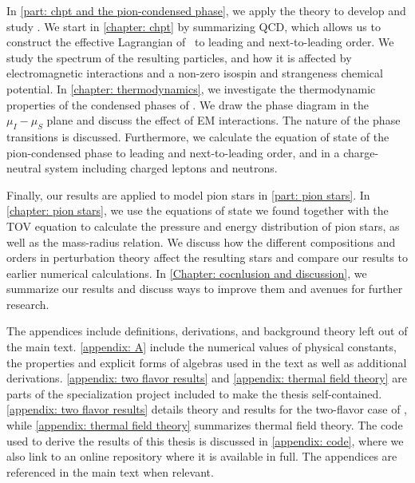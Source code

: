 In \autoref{part: chpt and the pion-condensed phase}, we apply the theory to develop and study \chpt.
We start in \autoref{chapter: chpt} by summarizing QCD, which allows us to construct the effective Lagrangian of \chpt\, to leading and next-to-leading order.
We study the spectrum of the resulting particles, and how it is affected by electromagnetic interactions and a non-zero isospin and strangeness chemical potential.
In \autoref{chapter: thermodynamics}, we investigate the thermodynamic properties of the condensed phases of \chpt.
We draw the phase diagram in the $\mu_I-\mu_S$ plane and discuss the effect of EM interactions.
The nature of the phase transitions is discussed.
Furthermore, we calculate the equation of state of the pion-condensed phase to leading and next-to-leading order, and in a charge-neutral system including charged leptons and neutrons.

Finally, our results are applied to model pion stars in \autoref{part: pion stars}.
In \autoref{chapter: pion stars}, we use the equations of state we found together with the TOV equation to calculate the pressure and energy distribution of pion stars, as well as the mass-radius relation.
We discuss how the different compositions and orders in perturbation theory affect the resulting stars and compare our results to earlier numerical calculations.
In \autoref{Chapter: cocnlusion and discussion}, we summarize our results and discuss ways to improve them and avenues for further research.

The appendices include definitions, derivations, and background theory left out of the main text.
\autoref{appendix: A} include the numerical values of physical constants, the properties and explicit forms of algebras used in the text as well as additional derivations.
\autoref{appendix: two flavor results} and \autoref{appendix: thermal field theory} are parts of the specialization project included to make the thesis self-contained.
\autoref{appendix: two flavor results} details theory and results for the two-flavor case of \chpt, while \autoref{appendix: thermal field theory} summarizes thermal field theory.
The code used to derive the results of this thesis is discussed in \autoref{appendix: code}, where we also link to an online repository where it is available in full.
The appendices are referenced in the main text when relevant.

